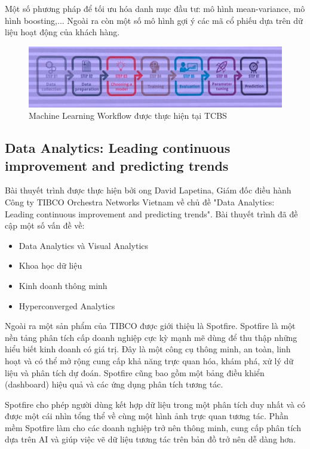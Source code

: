 \documentclass[14pt, a4paper]{article}
\numberwithin{equation}{section}
\numberwithin{figure}{section}
\numberwithin{dl}{section}
\numberwithin{md}{section}
\numberwithin{bd}{section}
\numberwithin{dn}{section}
\numberwithin{hq}{section}
\begin{document}
    Một số phương pháp để tối ưu hóa danh mục đầu tư: mô hình mean-variance, mô hình boosting,...
    Ngoài ra còn một số mô hình gợi ý các mã cổ phiếu dựa trên dữ liệu hoạt động của khách hàng.

    
    \begin{figure}[h!]
        \centering
        \includegraphics[scale=0.6]{TCBS_ML_Workflow.png}
        \caption{Machine Learning Workflow được thực hiện tại TCBS}
    \end{figure}

    \subsection{Data Analytics: Leading continuous improvement and predicting trends}

    Bài thuyết trình được thực hiện bởi ong David Lapetina, Giám đốc điều hành Công ty TIBCO Orchestra Networks Vietnam về chủ đề "Data Analytics: Leading continuous improvement and predicting trends".
    Bài thuyết trình đã đề cập một số vấn đề về:

    \begin{itemize}
        \item Data Analytics và Visual Analytics
        \item Khoa học dữ liệu
        \item Kinh doanh thông minh
        \item Hyperconverged Analytics
    \end{itemize}

    Ngoài ra một sản phẩm của TIBCO được giới thiệu là Spotfire.
    Spotfire là một nền tảng phân tích cấp doanh nghiệp cực kỳ mạnh mẽ dùng để thu thập những hiểu biết kinh doanh có giá trị. Đây là một công cụ thông minh, an toàn, linh hoạt và có thể mở rộng cung cấp khả năng trực quan hóa, khám phá, xử lý dữ liệu và phân tích dự đoán. Spotfire cũng bao gồm một bảng điều khiển (dashboard) hiệu quả và các ứng dụng phân tích tương tác.

    Spotfire cho phép người dùng kết hợp dữ liệu trong một phân tích duy nhất và có được một cái nhìn tổng thể về cùng một hình ảnh trực quan tương tác. Phần mềm Spotfire làm cho các doanh nghiệp trở nên thông minh, cung cấp phân tích dựa trên AI và giúp việc vẽ dữ liệu tương tác trên bản đồ trở nên dễ dàng hơn.
\end{document}
